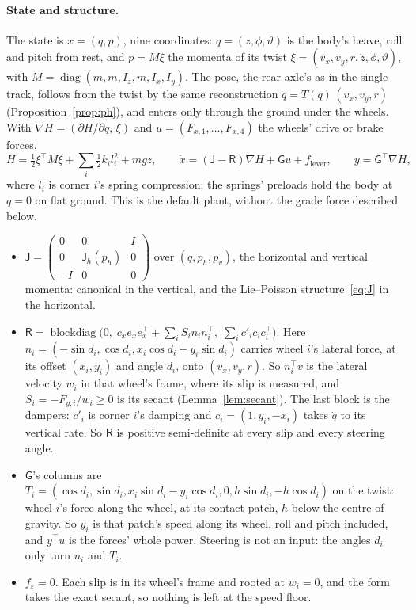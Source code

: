 \documentclass[11pt]{article}
\theoremstyle{remark}
\newcommand{\J}{\mathsf J}
\newcommand{\R}{\mathsf R}
\newcommand{\G}{\mathsf G}
\newcommand{\T}{^{\top}}
\begin{document}
\paragraph{State and structure.} The state is $x=(q,p)$, nine coordinates: $q=(z,\phi,\vartheta)$
is the body's heave, roll and pitch from rest, and $p=M\xi$ the momenta of its twist
$\xi=(v_x,v_y,r,\dot z,\dot\phi,\dot\vartheta)$, with $M=\operatorname{diag}(m,m,I_z,m,I_x,I_y)$.
The pose, the rear axle's as in the single track, follows from the twist by the same
reconstruction $\dot q=T(q)\,(v_x,v_y,r)$ (Proposition~\ref{prop:ph}), and enters only through the
ground under the wheels. With $\nabla H=(\partial H/\partial
q,\,\xi)$ and $u=(F_{x,1},\dots,F_{x,4})$ the wheels' drive or brake forces,
\begin{equation}
  H=\tfrac12\xi\T M\xi+\textstyle\sum_i\tfrac12k_il_i^2+mgz,\qquad
  \dot x=(\J-\R)\nabla H+\G u+f_{\mathrm{lever}},\qquad y=\G\T\nabla H,
  \label{eq:4w}
\end{equation}
where $l_i$ is corner $i$'s spring compression; the springs' preloads hold the body at $q=0$ on
flat ground. This is the default plant, without the grade force described below.
\begin{itemize}
  \item $\J=\begin{pmatrix}0&0&I\\0&\J_h(p_h)&0\\-I&0&0\end{pmatrix}$ over $(q,p_h,p_v)$, the
        horizontal and vertical momenta: canonical in the vertical, and the Lie--Poisson
        structure~\eqref{eq:J} in the horizontal.
  \item $\R=\operatorname{blockdiag}\big(0,\;c_xe_xe_x\T+\sum_iS_in_in_i\T,\;\sum_ic'_ic_ic_i\T\big)$.
        Here $n_i=(-\sin d_i,\cos d_i,x_i\cos d_i+y_i\sin d_i)$ carries wheel $i$'s lateral force,
        at its offset $(x_i,y_i)$ and angle $d_i$, onto $(v_x,v_y,r)$. So $n_i\T v$ is the lateral
        velocity $w_i$ in that wheel's frame, where its slip is measured, and $S_i=-F_{y,i}/w_i\ge0$
        is its secant (Lemma~\ref{lem:secant}). The last block is the dampers: $c'_i$ is corner
        $i$'s damping and $c_i=(1,y_i,-x_i)$ takes $\dot q$ to its vertical rate. So $\R$ is
        positive semi-definite at every slip and every steering angle.
  \item $\G$'s columns are $T_i=(\cos d_i,\sin d_i,x_i\sin d_i-y_i\cos d_i,0,h\sin d_i,-h\cos d_i)$
        on the twist: wheel $i$'s force along the wheel, at its contact patch, $h$ below the centre
        of gravity. So $y_i$ is that patch's speed along its wheel, roll and pitch included, and
        $y\T u$ is the forces' whole power. Steering is not an input: the angles $d_i$ only turn
        $n_i$ and $T_i$.
  \item $f_\varepsilon=0$. Each slip is in its wheel's frame and rooted at $w_i=0$, and the form
        takes the exact secant, so nothing is left at the speed floor.
\end{itemize}
\end{document}
